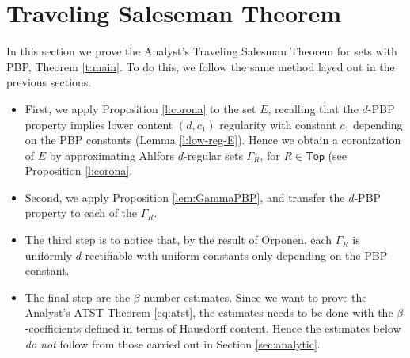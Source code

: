 \documentclass[11pt,reqno]{amsart}
\newcommand{\Top}{\mathsf{Top}}
\newtheorem{lemma}[theorem]{Lemma}
\theoremstyle{definition}
\theoremstyle{remark}
\numberwithin{equation}{section}
\newcommand{\R}{\mathbb{R}}
\theoremstyle{theorem}
\theoremstyle{definition}
\theoremstyle{remark}
\numberwithin{equation}{section}
\begin{document}
	
	\section{Traveling Saleseman Theorem}\label{sec:TST}
	In this section we prove the Analyst's Traveling Salesman Theorem for sets with PBP, Theorem \ref{t:main}. To do this, we follow the same method layed out in the previous sections. 
 \begin{itemize}
     \item First, we apply Proposition \ref{l:corona} to the set $E$, recalling that the $d$-PBP property implies lower content $(d,c_1)$ regularity with constant $c_1$ depending on the PBP constants (Lemma \ref{l:low-reg-E}). Hence we obtain a coronization of $E$ by approximating Ahlfors $d$-regular sets $\Gamma_R$, for $R \in \Top$ (see Proposition \ref{l:corona}.
     \item Second, we apply Proposition \ref{lem:GammaPBP}, and transfer the $d$-PBP property to each of the $\Gamma_R$. 
%
\item The third step is to notice that, by the result of Orponen, each $\Gamma_R$ is uniformly $d$-rectifiable with uniform constants only depending on the PBP constant.

\item The final step are the $\beta$ number estimates. Since we want to prove the Analyst's ATST Theorem \ref{eq:atst}, the estimates needs to be done with the $\beta$-coefficients defined in terms of Hausdorff content. Hence the estimates below \textit{do not} follow from those carried out in Section \ref{sec:analytic}.
  \end{itemize}
\end{document}
